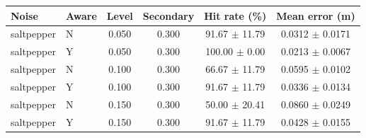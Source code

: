 \begin{tabular}{llcccc}
\hline
Noise & Aware & Level & Secondary & Hit rate (\%) & Mean error (m) \\
\hline
saltpepper & N & 0.050 & 0.300 & 91.67 $\pm$ 11.79 & 0.0312 $\pm$ 0.0171 \\
saltpepper & Y & 0.050 & 0.300 & 100.00 $\pm$ 0.00 & 0.0213 $\pm$ 0.0067 \\
saltpepper & N & 0.100 & 0.300 & 66.67 $\pm$ 11.79 & 0.0595 $\pm$ 0.0102 \\
saltpepper & Y & 0.100 & 0.300 & 91.67 $\pm$ 11.79 & 0.0336 $\pm$ 0.0134 \\
saltpepper & N & 0.150 & 0.300 & 50.00 $\pm$ 20.41 & 0.0860 $\pm$ 0.0249 \\
saltpepper & Y & 0.150 & 0.300 & 91.67 $\pm$ 11.79 & 0.0428 $\pm$ 0.0155 \\
\hline
\end{tabular}
